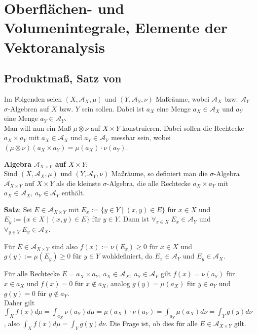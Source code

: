 \section{%
    Oberflächen- und Volumenintegrale, Elemente der Vektoranalysis%
}

\subsection{%
    Produktmaß, Satz von %
}

Im Folgenden seien $(X, \mathcal{A}_X, \mu)$ und $(Y, \mathcal{A}_Y, \nu)$
Maßräume, wobei $\mathcal{A}_X$ bzw. $\mathcal{A}_Y$ $\sigma$-Algebren auf
$X$ bzw. $Y$ sein sollen.
Dabei ist $a_X$ eine Menge $a_X \in \mathcal{A}_X$ und
$a_Y$ eine Menge $a_Y \in \mathcal{A}_Y$. \\
Man will nun ein Maß $\mu \otimes \nu$ auf $X \times Y$ konstruieren.
Dabei sollen die Rechtecke $a_X \times a_Y$ mit $a_X \in \mathcal{A}_X$ und
$a_Y \in \mathcal{A}_Y$ messbar sein, wobei
$(\mu \otimes \nu)(a_X \times a_Y) = \mu(a_X) \cdot \nu(a_Y)$.

\textbf{Algebra $\mathcal{A}_{X \times Y}$ auf $X \times Y$}: \\
Sind $(X, \mathcal{A}_X, \mu)$ und $(Y, \mathcal{A}_Y, \nu)$ Maßräume,
so definiert man die $\sigma$-Algebra $\mathcal{A}_{X \times Y}$ auf
$X \times Y$ als die kleinste $\sigma$-Algebra,
die alle Rechtecke $a_X \times a_Y$ mit
$a_X \in \mathcal{A}_X$, $a_Y \in \mathcal{A}_Y$ enthält.

\linie

\textbf{Satz}:
Sei $E \in \mathcal{A}_{X \times Y}$ mit
$E_x := \{y \in Y \;|\; (x, y) \in E\}$ für $x \in X$ und
$E_y := \{x \in X \;|\; (x, y) \in E\}$ für $y \in Y$.
Dann ist $\forall_{x \in X}\; E_x \in \mathcal{A}_Y$ und
$\forall_{y \in Y}\; E_y \in \mathcal{A}_X$.

Für $E \in \mathcal{A}_{X \times Y}$ sind also
$f(x) := \nu(E_x) \ge 0$ für $x \in X$ und
$g(y) := \mu(E_y) \ge 0$ für $y \in Y$ wohldefiniert,
da $E_x \in \mathcal{A}_Y$ und $E_y \in \mathcal{A}_X$.

\linie

Für alle Rechtecke $E = a_X \times a_Y$, $a_X \in \mathcal{A}_X$,
$a_Y \in \mathcal{A}_Y$ gilt $f(x) = \nu(a_Y)$ für $x \in a_X$ und
$f(x) = 0$ für $x \notin a_X$, analog $g(y) = \mu(a_X)$ für $y \in a_Y$ und
$g(y) = 0$ für $y \notin a_Y$. \\
Daher gilt $\int_X f(x) d\mu = \int_{a_X} \nu(a_Y) d\mu =
\mu(a_X) \cdot \nu(a_Y) = \int_{a_Y} \mu(a_X) d\nu = \int_Y g(y) d\nu$,
also $\int_X f(x) d\mu = \int_Y g(y) d\nu$.
Die Frage ist, ob dies für alle $E \in \mathcal{A}_{X \times Y}$ gilt.

